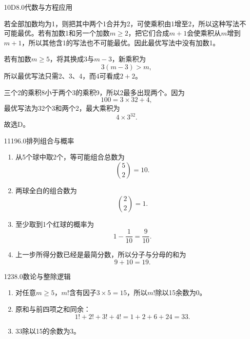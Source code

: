 \begin{solution}{10}{D}{8.0}{代数与方程应用}

若全部加数均为1，则把其中两个1合并为2，可使乘积由1增至2，所以这种写法不可能最优。若有加数1和另一个加数\(m\ge2\)，把它们合成\(m+1\)会使乘积从\(m\)增到\(m+1\)，所以其他含1的写法也不可能最优。因此最优写法中没有加数1。

若有加数\(m\ge5\)，将其换成3与\(m-3\)，新乘积为
\[
  3(m-3)>m,
\]
所以最优写法只需2、3、4，而4可看成\(2+2\)。

三个2的乘积8小于两个3的乘积9，所以2最多出现两个。因为
\[
  100=3\times32+4,
\]
最优写法为32个3和两个2，最大乘积为
\[
  4\times3^{32}.
\]
故选D。

\end{solution}


\begin{solution}{11}{19}{6.0}{排列组合与概率}
\begin{enumerate}[label=\textbf{Step \arabic*:},leftmargin=*]
  \item 从5个球中取2个，等可能组合总数为
  \[
    \binom52=10.
  \]
  \item 两球全白的组合数为
  \[
    \binom22=1.
  \]
  \item 至少取到1个红球的概率为
  \[
    1-\frac1{10}=\frac9{10}.
  \]
  \item 上一步所得分数已经是最简分数，所以分子与分母的和为
  \[
    9+10=19.
  \]
\end{enumerate}
\end{solution}

\begin{solution}{12}{3}{8.0}{数论与整除逻辑}
\begin{enumerate}[label=\textbf{Step \arabic*:},leftmargin=*]
  \item 对任意\(m\ge5\)，\(m!\)含有因子\(3\times5=15\)，所以\(m!\)除以15余数为0。
  \item 原和与前四项之和同余：
  \[
    1!+2!+3!+4!=1+2+6+24=33.
  \]
  \item 33除以15的余数为3。
\end{enumerate}
\end{solution}

